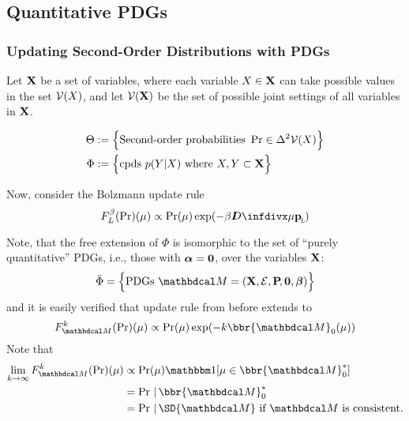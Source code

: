 \documentclass{article}
\begin{document}
\subsection{Quantitative PDGs}

\subsubsection{Updating Second-Order Distributions with PDGs}
Let $\mathbf{X}$ be a set of variables, where each variable $X \in \mathbf{X}$ can take possible values in the set $\mathcal V(X)$, and let $\mathcal V(\mathbf{X})$ be the set of possible joint settings of all variables in $\mathbf{X}$.

\begin{align*}
    \Theta &:=
        \Big\{
        \text{Second-order probabilities}~ \Pr \in \Delta^2 \mathcal V(X)
        \Big\} \\
    \Phi &:= \Big\{ \text{cpds}~ p(Y|X)
        \text{ where }  X, Y \subset \mathbf{X} \Big\}
\end{align*}

Now, consider the Bolzmann update rule
\[
    F_L^{\beta}(\Pr) (\mu) \propto \Pr(\mu) \exp(-\beta \kldiv\mu \bp)
\]

Note, that the free extension of $\Phi$ is isomorphic to the set of ``purely quantitative'' PDGs, i.e., those with $\boldsymbol\alpha = \mathbf{0}$, over the variables $\mathbf{X}$:
$$
    \bar\Phi = \Big\{ \text{PDGs}~\dg M = (\mat X, \Ed, \bP[], \mat0, \bbeta) \Big\}
$$
and it is easily verified that update rule from before extends to
\[
    F_{\dg M}^k(\Pr)(\mu) \propto \Pr(\mu) \exp(- k \bbr{\dg M}_0(\mu))
\]
Note that
\begin{align*}
    \lim_{k \to \infty} F_{\dg M}^k(\Pr)(\mu) &\propto
        \Pr(\mu) \mathbbm1[\mu \in {\bbr{\dg M}^*_0}] \\
        &= \Pr \,|\, \bbr{\dg M}^*_0 \\
        &= \Pr \,|\, \SD{\dg M} \text{~if $\dg M$ is consistent.}
\end{align*}
\end{document}
